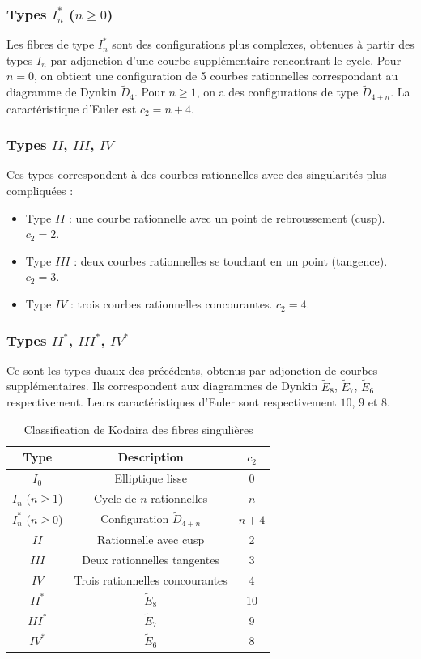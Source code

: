 \subsubsection{Types $I_n^*$ ($n \ge 0$)}

Les fibres de type $I_n^*$ sont des configurations plus complexes, obtenues à partir des types $I_n$ par adjonction d'une courbe supplémentaire rencontrant le cycle. Pour $n=0$, on obtient une configuration de 5 courbes rationnelles correspondant au diagramme de Dynkin $\tilde D_4$. Pour $n \ge 1$, on a des configurations de type $\tilde D_{4+n}$. La caractéristique d'Euler est $c_2 = n+4$.

\subsubsection{Types $II$, $III$, $IV$}

Ces types correspondent à des courbes rationnelles avec des singularités plus compliquées :
\begin{itemize}
\item Type $II$ : une courbe rationnelle avec un point de rebroussement (cusp). $c_2 = 2$.
\item Type $III$ : deux courbes rationnelles se touchant en un point (tangence). $c_2 = 3$.
\item Type $IV$ : trois courbes rationnelles concourantes. $c_2 = 4$.
\end{itemize}

\subsubsection{Types $II^*$, $III^*$, $IV^*$}

Ce sont les types duaux des précédents, obtenus par adjonction de courbes supplémentaires. Ils correspondent aux diagrammes de Dynkin $\tilde E_8$, $\tilde E_7$, $\tilde E_6$ respectivement. Leurs caractéristiques d'Euler sont respectivement $10$, $9$ et $8$.

\begin{table}[h]
\centering
\begin{tabular}{|c|c|c|}
\hline
\textbf{Type} & \textbf{Description} & $c_2$ \\
\hline
$I_0$ & Elliptique lisse & 0 \\
$I_n$ ($n \ge 1$) & Cycle de $n$ rationnelles & $n$ \\
$I_n^*$ ($n \ge 0$) & Configuration $\tilde D_{4+n}$ & $n+4$ \\
$II$ & Rationnelle avec cusp & 2 \\
$III$ & Deux rationnelles tangentes & 3 \\
$IV$ & Trois rationnelles concourantes & 4 \\
$II^*$ & $\tilde E_8$ & 10 \\
$III^*$ & $\tilde E_7$ & 9 \\
$IV^*$ & $\tilde E_6$ & 8 \\
\hline
\end{tabular}
\caption{Classification de Kodaira des fibres singulières}
\end{table}

